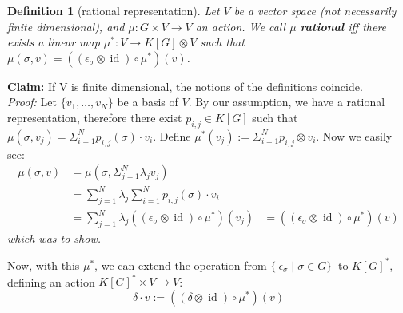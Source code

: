 \message{ !name(roughdraft.tex)}\documentclass{article}
\theoremstyle{prrt}
\newtheorem{definition}[theorem]{Definition}
\begin{document}
\smallskip
\begin{definition}[rational representation]
  Let $V$ be a vector space (not necessarily finite dimensional), and $ \mu : G \times V \longrightarrow V $ an action.
  We call $ \mu $ \textbf{rational} iff there exists a linear map $ \mu^\ast : V \longrightarrow K[G] \otimes V $ such that $ \mu \left( \sigma , v \right) = \left( \left( \epsilon_\sigma \otimes \operatorname{id} \right) \circ \mu^\ast \right) \left(v\right) $. 
\end{definition}
\textbf{Claim:} If V is finite dimensional, the notions of the definitions coincide.\\
\textit{Proof:} Let $\{ v_1 , \ldots , v_N \}$ be a basis of $V$.
By our assumption, we have a rational representation, therefore there exist $p_{i,j} \in K \left\lbrack G \right\rbrack$ such that $\mu\left( \sigma, v_j \right) = \Sigma_{i=1}^{N} p_{i,j}\left(\sigma\right) \cdot v_i$.
Define $\mu^\ast \left( v_j \right) := \Sigma_{i=1}^{N} p_{i,j} \otimes v_i$.
Now we easily see:
\begin{equation}
  \begin{aligned}
    \mu\left(\sigma,v\right)
    &= \mu \left(\sigma, \Sigma_{j=1}^N \lambda_j v_j \right) \\
    &= \sum_{j=1}^N \lambda_j  \sum_{i=1}^N p_{i,j}\left(\sigma\right) \cdot v_i \\
    &= \sum_{j=1}^N \lambda_j \left(\left(\epsilon_\sigma \otimes \operatorname{id} \right) \circ \mu^\ast \right) \left(v_j \right)
    &= \left(\left(\epsilon_\sigma \otimes \operatorname{id} \right) \circ \mu^\ast \right) \left(v \right)
  \end{aligned}
\end{equation}
\textit{which was to show.}

\smallskip
Now, with this $\mu^\ast$, we can extend the operation from $\{\ \epsilon_\sigma \mid \sigma \in G \}\ $ to $K \left\lbrack G \right\rbrack^\ast$, defining an action $K \left\lbrack G \right\rbrack^\ast \times V \longrightarrow V$:
\begin{equation}
  \delta \cdot v := \left(\left( \delta \otimes \operatorname{id} \right) \circ \mu^\ast \right) \left(v\right)
\end{equation}
\end{document}
